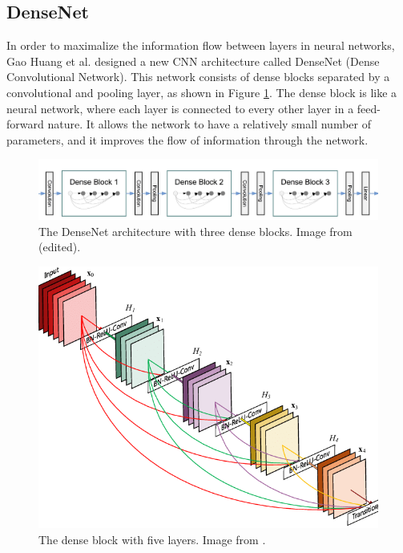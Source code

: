 \documentclass[thesis=B,english]{FITthesis}[2019/12/23]
\begin{document}
\subsection{DenseNet}
In order to maximalize the information flow between layers in neural networks, Gao Huang et al. \cite{DBLP:journals/corr/HuangLW16a} designed a new CNN architecture called DenseNet (Dense Convolutional Network). This network consists of dense blocks separated by a convolutional and pooling layer, as shown in Figure \ref{fig:dense_net}. The dense block is like a neural network, where each layer is connected to every other layer in a feed-forward nature. It allows the network to have a relatively small number of parameters, and it improves the flow of information through the network.

\begin{figure}[ht]
		\includegraphics[scale=0.115]{images/DenseNet.jpeg}
		\centering
		\caption{The DenseNet architecture with three dense blocks. Image from \cite{DBLP:journals/corr/HuangLW16a} (edited).}
		\label{fig:dense_net}
\end{figure}

\begin{figure}[ht]
		\includegraphics[scale=0.4]{images/dense_block.png}
		\centering
		\caption{The dense block with five layers. Image from \cite{DBLP:journals/corr/HuangLW16a}.}
\end{figure}
\end{document}
